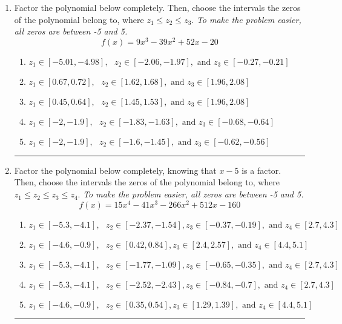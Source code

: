 \documentclass[14pt]{extbook}
\newcommand{\litem}[1]{\item#1\hspace*{-1cm}\rule{\textwidth}{0.4pt}}
\begin{document}
\begin{enumerate}
{\begin{enumerate}[label=\Alph*.]
\end{enumerate} }
\litem{
Factor the polynomial below completely. Then, choose the intervals the zeros of the polynomial belong to, where $z_1 \leq z_2 \leq z_3$. \textit{To make the problem easier, all zeros are between -5 and 5.}\[ f(x) = 9x^{3} -39 x^{2} +52 x -20 \]\begin{enumerate}[label=\Alph*.]
\item \( z_1 \in [-5.01, -4.98], \text{   }  z_2 \in [-2.06, -1.97], \text{   and   } z_3 \in [-0.27, -0.21] \)
\item \( z_1 \in [0.67, 0.72], \text{   }  z_2 \in [1.62, 1.68], \text{   and   } z_3 \in [1.96, 2.08] \)
\item \( z_1 \in [0.45, 0.64], \text{   }  z_2 \in [1.45, 1.53], \text{   and   } z_3 \in [1.96, 2.08] \)
\item \( z_1 \in [-2, -1.9], \text{   }  z_2 \in [-1.83, -1.63], \text{   and   } z_3 \in [-0.68, -0.64] \)
\item \( z_1 \in [-2, -1.9], \text{   }  z_2 \in [-1.6, -1.45], \text{   and   } z_3 \in [-0.62, -0.56] \)

\end{enumerate} }
\litem{
Factor the polynomial below completely, knowing that $x -5$ is a factor. Then, choose the intervals the zeros of the polynomial belong to, where $z_1 \leq z_2 \leq z_3 \leq z_4$. \textit{To make the problem easier, all zeros are between -5 and 5.}\[ f(x) = 15x^{4} -41 x^{3} -266 x^{2} +512 x -160 \]\begin{enumerate}[label=\Alph*.]
\item \( z_1 \in [-5.3, -4.1], \text{   }  z_2 \in [-2.37, -1.54], z_3 \in [-0.37, -0.19], \text{   and   } z_4 \in [2.7, 4.3] \)
\item \( z_1 \in [-4.6, -0.9], \text{   }  z_2 \in [0.42, 0.84], z_3 \in [2.4, 2.57], \text{   and   } z_4 \in [4.4, 5.1] \)
\item \( z_1 \in [-5.3, -4.1], \text{   }  z_2 \in [-1.77, -1.09], z_3 \in [-0.65, -0.35], \text{   and   } z_4 \in [2.7, 4.3] \)
\item \( z_1 \in [-5.3, -4.1], \text{   }  z_2 \in [-2.52, -2.43], z_3 \in [-0.84, -0.7], \text{   and   } z_4 \in [2.7, 4.3] \)
\item \( z_1 \in [-4.6, -0.9], \text{   }  z_2 \in [0.35, 0.54], z_3 \in [1.29, 1.39], \text{   and   } z_4 \in [4.4, 5.1] \)


\end{enumerate}}
\end{enumerate}
\end{document}
